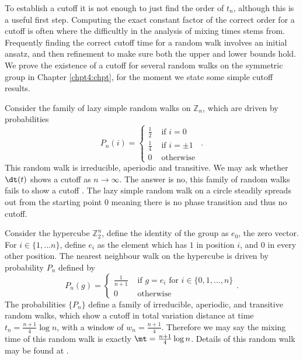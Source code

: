 \documentclass[11pt]{report}
\begin{document}
To 
establish a cutoff it is not enough to just find the order of $t_{n}$, 
although this is a useful first step. Computing the exact constant factor of the correct order for a cutoff is often where the difficultly in the analysis of mixing times stems from. Frequently finding the  correct cutoff time 
for a random walk involves 
an initial ansatz, and then refinement to make sure both the upper and lower 
bounds hold. We prove the existence of a cutoff for several random walks 
on the symmetric group in Chapter \ref{chpt4:chpt}, for the moment we state some simple cutoff results.






\begin{example}
	\label{chpt2:ex:lazysimple}
	Consider the family of lazy simple random walks on $\mathbb{Z}_{n}$, which are driven by probabilities
	\[P_{n}(i)= \begin{cases}
	\frac{1}{2} & \text{ if } i =0 \\
	\frac{1}{4} & \text{ if } i = \pm 1\\
	0 & \text{ otherwise }
	\end{cases}.\]
	This random walk is irreducible, aperiodic and transitive. We may ask 
	whether $\dt(t)$ shows a cutoff as $n\to\infty$. The answer is no, this 
	family of random walks fails to show a cutoff \cite[Section 
	3.3]{saloff2004random}. The  lazy simple random walk on a circle steadily 
	spreads out from the starting point $0$ meaning there is no phase transition and thus no cutoff. 
\end{example}

\begin{example}
	\label{chpt2:ex:hypercube}
	Consider the hypercube $\mathbb{Z}_{2}^{n}$, define the identity of the group as $e_{0}$, the zero vector. For $i\in\{1,\dots n\}$, define $e_{i}$ as
	the element which has $1$ in position $i$, and $0$ in every other position. The nearest neighbour walk on the hypercube is driven by probability $P_{n}$ defined by
	\[P_{n}(g)= \begin{cases}
	\frac{1}{n+1} & \text{ if }g = e_{i} \text{ for } i\in\{0,1,\ldots,n\}  
	\\0 & \text{ otherwise }\end{cases}.\]
	The probabilities $\{P_{n}\}$ define a family of irreducible, aperiodic, and transitive random walks, 
	which show a cutoff in total variation distance at time 
	$t_{n} = \frac{n+1}{4}\log n$, with a window of $w_{n} = \frac{n+1}{4}$. 
	Therefore we may say the mixing time of this random walk is exactly $\mt = 
	\frac{n+1}{4} \log n$. Details of this random walk may be found at \cite[Chapter 3C]{Diaconis1988}.
	
	
	
\end{example}
\end{document}
